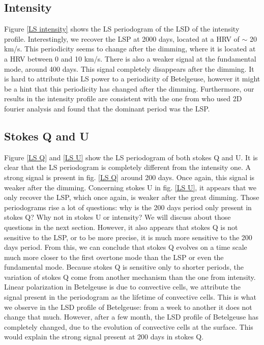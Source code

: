 \documentclass{aa}
\begin{document}
\subsection{Intensity}
Figure \ref{LS intensity} shows the LS periodogram of the LSD of the intensity profile. Interestingly, we recover the LSP at 2000 days, 
located at a HRV of $\sim$ 20 km/s. This periodicity seems to change after the dimming, where it is located at a HRV between 0 and 10 km/s. 
There is also a weaker signal at the fundamental mode, around 400 days. This signal completely disappears after the dimming. It is hard to attribute 
this LS power to a periodicity of Betelgeuse, however it might be a hint that this periodicity has changed after the dimming. Furthermore, our results 
in the intensity profile are consistent with the one from \cite{mathias_evolution_2018} who used 2D fourier analysis and found that the dominant period was the LSP. 


\subsection{Stokes Q and U}

Figure \ref{LS Q} and \ref{LS U} show the LS periodogram of both stokes Q and U. It is clear that the LS periodogram is completely different 
from the intensity one. A strong signal is present in fig. \ref{LS Q} around 200 days. Once again, this signal is weaker after the dimming.
Concerning stokes U in fig. \ref{LS U}, it appears that we only recover the LSP, which once again, is weaker after the great dimming. 
Those periodograms rise a lot of questions: why is the 200 days period only present in stokes Q? Why not in stokes U or intensity? 
We will discuss about those questions in the next section. However, it also appears that stokes Q is not sensitive to the LSP, or to be more precise, 
it is much more sensitive to the 200 days period. From this, we can conclude that stokes Q evolves on a time scale much more closer to the first overtone 
mode than the LSP or even the fundamental mode. Because stokes Q is sensitive only to shorter periods, the variation of stokes Q come from another mechanism 
than the one from intensity. Linear polarization in Betelgeuse is due to convective cells, we attribute the signal present in the periodogram 
as the lifetime of convective cells. This is what we observe in the LSD profile of Betelgeuse: from a week to another it does not change that much. 
However, after a few month, the LSD profile of Betelgeuse has completely changed, due to the evolution of convective cells at the surface. 
This would explain the strong signal present at 200 days in stokes Q. 
\end{document}
